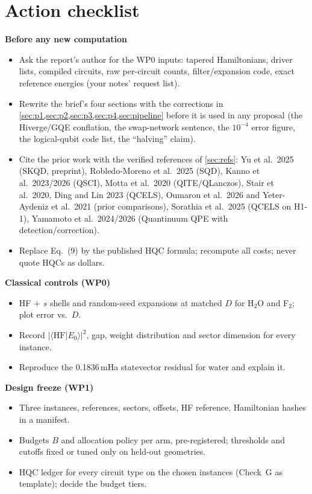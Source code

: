 \documentclass[11pt,a4paper]{article}
\newcommand{\braket}[2]{\langle #1\vert #2\rangle}
\newcommand{\report}{the report}
\begin{document}
\section{Action checklist}\label{sec:checklist}
\textbf{Before any new computation}
\begin{itemize}
\item[$\square$] Ask \report's author for the WP0 inputs: tapered Hamiltonians, driver lists, compiled circuits, raw per-circuit counts, filter/expansion code, exact reference energies (your notes' request list).
\item[$\square$] Rewrite the brief's four sections with the corrections in \cref{sec:p1,sec:p2,sec:p3,sec:p4,sec:pipeline} before it is used in any proposal (the Hiverge/GQE conflation, the swap-network sentence, the $10^{-4}$ error figure, the logical-qubit code list, the ``halving'' claim).
\item[$\square$] Cite the prior work with the verified references of \cref{sec:refs}: Yu et al.\ 2025 (SKQD, preprint), Robledo-Moreno et al.\ 2025 (SQD), Kanno et al.\ 2023/2026 (QSCI), Motta et al.\ 2020 (QITE/QLanczos), Stair et al.\ 2020, Ding and Lin 2023 (QCELS), Oumarou et al.\ 2026 and Yeter-Aydeniz et al.\ 2021 (prior comparisons), Sorathia et al.\ 2025 (QCELS on H1-1), Yamamoto et al.\ 2024/2026 (Quantinuum QPE with detection/correction).
\item[$\square$] Replace Eq.~(9) by the published HQC formula; recompute all costs; never quote HQCs as dollars.
\end{itemize}
\textbf{Classical controls (WP0)}
\begin{itemize}
\item[$\square$] HF + $s$ shells and random-seed expansions at matched $D$ for H$_2$O and F$_2$; plot error vs.\ $D$.
\item[$\square$] Record $|\braket{\mathrm{HF}}{E_0}|^2$, gap, weight distribution and sector dimension for every instance.
\item[$\square$] Reproduce the 0.1836\,mHa statevector residual for water and explain it.
\end{itemize}
\textbf{Design freeze (WP1)}
\begin{itemize}
\item[$\square$] Three instances, references, sectors, offsets, HF reference, Hamiltonian hashes in a manifest.
\item[$\square$] Budgets $B$ and allocation policy per arm, pre-registered; thresholds and cutoffs fixed or tuned only on held-out geometries.
\item[$\square$] HQC ledger for every circuit type on the chosen instances (Check~G as template); decide the budget tiers.
\end{itemize}
\end{document}

